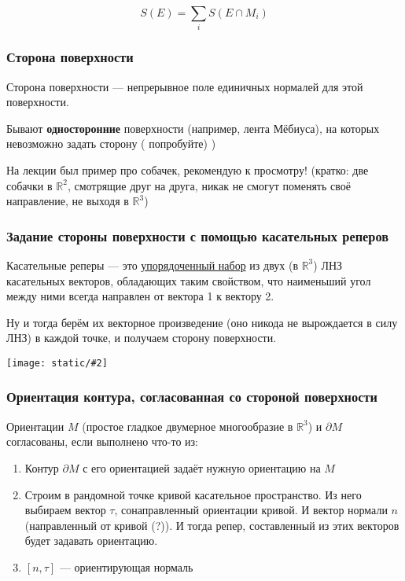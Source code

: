 \documentclass{article}
\def\images#1#2{\begin{center}\texttt{[image: static/\#2]}\end{center}}
\begin{document}
\[S(E) = \sum_i S(E \cap M_i)\]

\subsubsection{Сторона поверхности}

Сторона поверхности --- непрерывное поле единичных нормалей для этой поверхности.

Бывают \textbf{односторонние} поверхности (например, лента Мёбиуса), на которых невозможно задать сторону ( попробуйте) )

На лекции был пример про собачек, рекомендую к просмотру! (кратко: две собачки в $\mathbb{R}^2$, смотрящие друг на друга, никак не смогут поменять своё направление, не выходя в $\mathbb{R}^3$)

\subsubsection{Задание стороны поверхности с помощью касательных реперов}

Касательные реперы --- это \underline{упорядоченный набор} из двух (в $\mathbb{R}^3$) ЛНЗ касательных векторов, обладающих таким свойством, что наименьший угол между ними всегда направлен от вектора 1 к вектору 2.

Ну и тогда берём их векторное произведение (оно никода не вырождается в силу ЛНЗ) в каждой точке, и получаем сторону поверхности.

\images{0.3}{kas_repe.jpg}

\subsubsection{Ориентация контура, согласованная со стороной поверхности}

Ориентации $M$ (простое гладкое двумерное многообразие в $\mathbb{R}^3$) и $\partial M$ согласованы, если выполнено что-то из:

\begin{enumerate}
    \item Контур $\partial M$ с его ориентацией задаёт нужную ориентацию на $M$ 
    \item Строим в рандомной точке кривой касательное пространство. Из него выбираем вектор $\tau$, сонаправленный ориентации кривой. И вектор нормали $n$ (направленный от кривой (?)). И тогда репер, составленный из этих векторов будет задавать ориентацию.
    \item $[n, \tau]$ --- ориентирующая нормаль
\end{enumerate}
\end{document}
